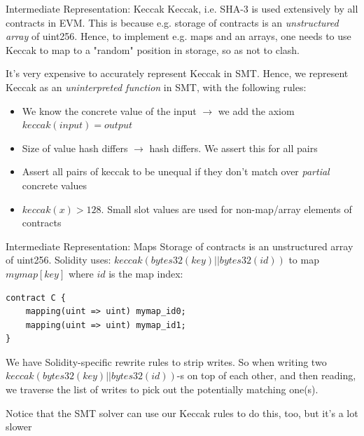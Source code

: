 \documentclass[aspectratio=169]{beamer}
\begin{document}
\begin{frame}[fragile=singleslide]{Intermediate Representation: Keccak}
Keccak, i.e. SHA-3 is used extensively by all contracts in EVM. This is because e.g. storage of contracts is an \emph{unstructured array} of uint256. Hence, to implement e.g. maps and an arrays, one needs to use Keccak to map to a "random" position in storage, so as not to clash.
\bigskip

It's very expensive to accurately represent Keccak in SMT. Hence, we represent Keccak as an \emph{uninterpreted function} in SMT, with the following rules:
\begin{itemize}
\item We know the concrete value of the input $\rightarrow$ we add the axiom $keccak(input)=output$
\item Size of value hash differs $\rightarrow$ hash differs. We assert this for all pairs
\item Assert all pairs of keccak to be unequal if they don't match over \emph{partial} concrete values
\item $keccak(x) > 128$. Small slot values are used for non-map/array elements of contracts
\end{itemize}
\end{frame}

\begin{frame}[fragile=singleslide]{Intermediate Representation: Maps}
Storage of contracts is an unstructured array of uint256. Solidity uses: $keccak (bytes32(key) || bytes32(id))$ to map $mymap[key]$ where $id$ is the map index:

\begin{Verbatim}[frame=single, framerule=0.2mm, framesep=2mm,fontsize=\small]
contract C {
    mapping(uint => uint) mymap_id0;
    mapping(uint => uint) mymap_id1;
}
\end{Verbatim}
We have Solidity-specific rewrite rules to strip writes. So when writing two $keccak (bytes32(key) || bytes32(id))$-s on top of each other, and then reading, we traverse the list of writes to pick out the potentially matching one(s).
\bigskip

Notice that the SMT solver can use our Keccak rules to do this, too, but it's a lot slower
\end{frame}
\end{document}
